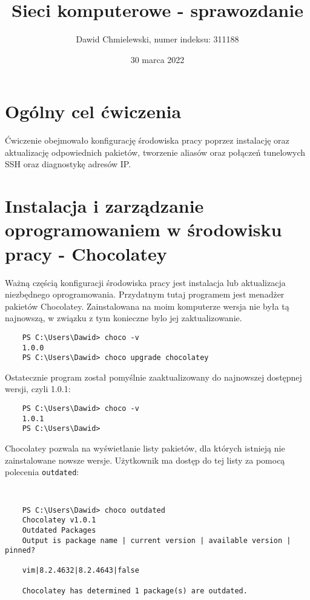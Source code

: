 \documentclass[a4paper,11pt]{article}
\title{ Sieci komputerowe - sprawozdanie }
\author{ Dawid Chmielewski, numer indeksu: 311188 }
\date{30 marca 2022}
\begin{document}

\section{Ogólny cel ćwiczenia}

Ćwiczenie obejmowało konfigurację środowiska pracy poprzez instalację oraz aktualizację odpowiednich pakietów, tworzenie aliasów oraz połączeń tunelowych SSH oraz diagnostykę adresów IP.

\section{Instalacja i zarządzanie oprogramowaniem w środowisku pracy - Chocolatey}

Ważną częścią konfiguracji środowiska pracy jest instalacja lub aktualizacja niezbędnego oprogramowania. Przydatnym tutaj programem jest menadżer pakietów Chocolatey. Zainstalowana na moim komputerze wersja nie była tą najnowszą, w związku z tym konieczne bylo jej zaktualizowanie.

\begin{verbatim}
    PS C:\Users\Dawid> choco -v
    1.0.0
    PS C:\Users\Dawid> choco upgrade chocolatey
\end{verbatim}

Ostatecznie program został pomyślnie zaaktualizowany do najnowszej dostępnej wersji, czyli 1.0.1:

\begin{verbatim}
    PS C:\Users\Dawid> choco -v
    1.0.1
    PS C:\Users\Dawid>
\end{verbatim}

Chocolatey pozwala na wyświetlanie listy pakietów, dla których istnieją nie zainstalowane nowsze wersje. Użytkownik ma dostęp do tej listy za pomocą polecenia {\tt outdated}:

{\tt
\begin{verbatim}
    PS C:\Users\Dawid> choco outdated
    Chocolatey v1.0.1
    Outdated Packages
    Output is package name | current version | available version | pinned?

    vim|8.2.4632|8.2.4643|false

    Chocolatey has determined 1 package(s) are outdated.
\end{verbatim}
}
\end{document}
